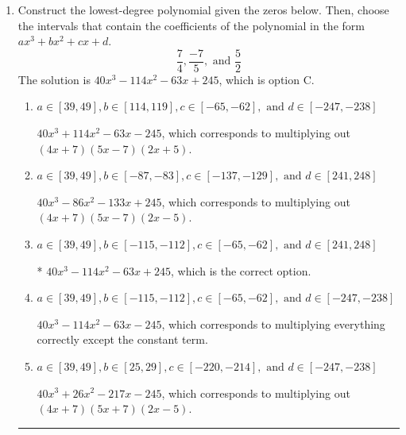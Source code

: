 \documentclass{extbook}[14pt]
\newcommand{\litem}[1]{\item #1

\rule{\textwidth}{0.4pt}}
\begin{document}
\begin{enumerate}\litem{
Construct the lowest-degree polynomial given the zeros below. Then, choose the intervals that contain the coefficients of the polynomial in the form $ax^3+bx^2+cx+d$.
\[ \frac{7}{4}, \frac{-7}{5}, \text{ and } \frac{5}{2} \]The solution is \( 40x^{3} -114 x^{2} -63 x + 245 \), which is option C.\begin{enumerate}[label=\Alph*.]
\item \( a \in [39, 49], b \in [114, 119], c \in [-65, -62], \text{ and } d \in [-247, -238] \)

$40x^{3} +114 x^{2} -63 x -245$, which corresponds to multiplying out $(4x + 7)(5x -7)(2x + 5)$.
\item \( a \in [39, 49], b \in [-87, -83], c \in [-137, -129], \text{ and } d \in [241, 248] \)

$40x^{3} -86 x^{2} -133 x + 245$, which corresponds to multiplying out $(4x + 7)(5x -7)(2x -5)$.
\item \( a \in [39, 49], b \in [-115, -112], c \in [-65, -62], \text{ and } d \in [241, 248] \)

* $40x^{3} -114 x^{2} -63 x + 245$, which is the correct option.
\item \( a \in [39, 49], b \in [-115, -112], c \in [-65, -62], \text{ and } d \in [-247, -238] \)

$40x^{3} -114 x^{2} -63 x -245$, which corresponds to multiplying everything correctly except the constant term.
\item \( a \in [39, 49], b \in [25, 29], c \in [-220, -214], \text{ and } d \in [-247, -238] \)

$40x^{3} +26 x^{2} -217 x -245$, which corresponds to multiplying out $(4x + 7)(5x + 7)(2x -5)$.
\end{enumerate}

}
\end{enumerate}
\end{document}

